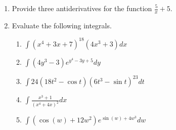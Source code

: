 \documentclass[12pt]{article}
\begin{document}
\begin{enumerate}
\begin{enumerate}
\end{enumerate}
\item Provide three antiderivatives for the function $\frac{5}{x}+5$. 
\newpage
\item Evaluate the following integrals. 
\begin{enumerate}
\item $\int(x^4+3x+7)^{18}(4x^3+3)dx$
\vspace{3cm}
\item $\int(4y^3-3)e^{y^4-3y+5}dy$
\vspace{3cm}
\item $\int24(18t^2-\cos t)(6t^3-\sin t)^{23}dt$
\vspace{3cm}
\item $\int\frac{x^3+1}{(x^4+4x)^2}dx$
\vspace{3cm}
\item $\int(\cos(w)+12w^2)e^{\sin(w)+4w^3}dw$
\end{enumerate}
\end{enumerate}
\end{document}
